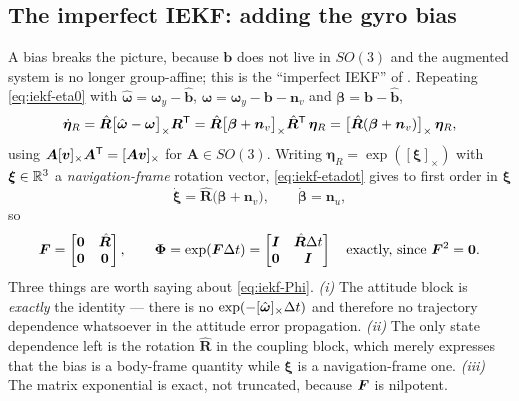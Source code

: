 \subsection{The imperfect IEKF: adding the gyro bias}
A bias breaks the picture, because $\bm{b}$ does not live in $SO(3)$ and the augmented system is no
longer group-affine; this is the ``imperfect IEKF'' of \cite[Sec.~V]{barrau2017iekf}. Repeating
\eqref{eq:iekf-eta0} with $\hat{\bm{\omega}}=\bm{\omega}_y-\hat{\bm{b}}$,
$\bm{\omega}=\bm{\omega}_y-\bm{b}-\bm{n}_v$ and $\bm{\beta}=\bm{b}-\hat{\bm{b}}$,
\begin{equation}
\dot{\bm{\eta}}_R = \hat{\bm{R}}\big[\hat{\bm{\omega}}-\bm{\omega}\big]_\times\bm{R}^{\mathsf{T}}
 = \hat{\bm{R}}\big[\bm{\beta}+\bm{n}_v\big]_\times\hat{\bm{R}}^{\mathsf{T}}\,\bm{\eta}_R
 = \big[\hat{\bm{R}}(\bm{\beta}+\bm{n}_v)\big]_\times\,\bm{\eta}_R ,
\label{eq:iekf-etadot}
\end{equation}
using $\bm{A}[\bm{v}]_\times\bm{A}^{\mathsf{T}}=[\bm{A}\bm{v}]_\times$ for $\bm{A}\in SO(3)$. Writing
$\bm{\eta}_R=\exp([\bm{\xi}]_\times)$ with $\bm{\xi}\in\mathbb{R}^3$ a \emph{navigation-frame} rotation
vector, \eqref{eq:iekf-etadot} gives to first order in $\bm{\xi}$
\begin{equation}
\dot{\bm{\xi}} = \hat{\bm{R}}\big(\bm{\beta}+\bm{n}_v\big),
\qquad
\dot{\bm{\beta}} = \bm{n}_u ,
\label{eq:iekf-err}
\end{equation}
so
\begin{equation}
\bm{F} = \begin{bmatrix}\bm{0} & \hat{\bm{R}}\\ \bm{0}&\bm{0}\end{bmatrix},
\qquad
\bm{\Phi}=\exp(\bm{F}\Delta t)=\begin{bmatrix}\bm{I} & \hat{\bm{R}}\Delta t\\ \bm{0}&\bm{I}\end{bmatrix}
\quad\text{exactly, since } \bm{F}^2=\bm{0}.
\label{eq:iekf-Phi}
\end{equation}
Three things are worth saying about \eqref{eq:iekf-Phi}. \emph{(i)} The attitude block is
\emph{exactly} the identity --- there is no $\exp(-[\hat{\bm{\omega}}]_\times\Delta t)$ and therefore no
trajectory dependence whatsoever in the attitude error propagation. \emph{(ii)} The only state
dependence left is the rotation $\hat{\bm{R}}$ in the coupling block, which merely expresses that
the bias is a body-frame quantity while $\bm{\xi}$ is a navigation-frame one. \emph{(iii)} The
matrix exponential is exact, not truncated, because $\bm{F}$ is nilpotent.

